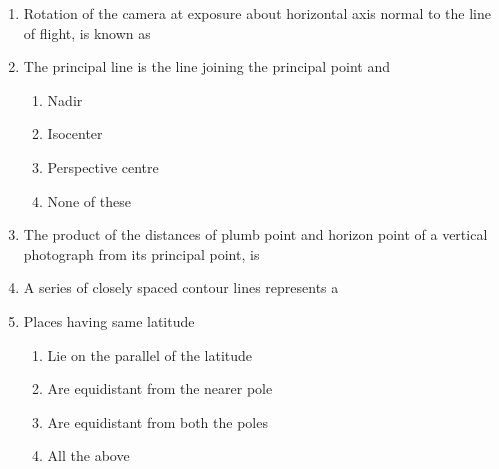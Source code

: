 \documentclass[11pt,a4paper]{article}
\begin{document}
\begin{enumerate}
\item{Rotation of the camera at exposure about horizontal axis normal to the line of flight, is known as}
\\
\item{The principal line is the line joining the principal point and}
\begin{enumerate}[label=\Alph*.]
\item{Nadir}
\item{Isocenter}
\item{Perspective centre}
\item{None of these}
\end{enumerate}
\item{The product of the distances of plumb point and horizon point of a vertical photograph from its principal point, is}
\\
\item{A series of closely spaced contour lines represents a}
\\
\item{Places having same latitude}
\begin{enumerate}[label=\Alph*.]
\item{Lie on the parallel of the latitude}
\item{Are equidistant from the nearer pole}
\item{Are equidistant from both the poles}
\item{All the above}

\end{enumerate}
\end{enumerate}
\end{document}
